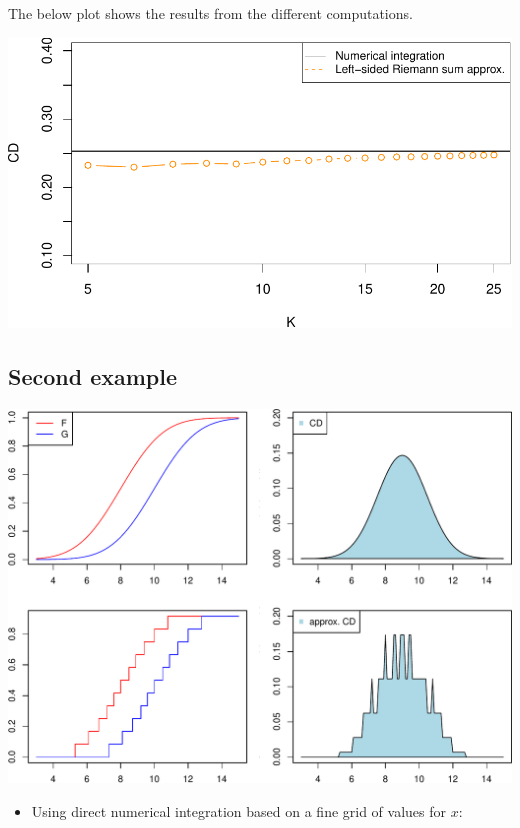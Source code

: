 \documentclass[
]{article}
\providecommand{\tightlist}{%
  \setlength{\itemsep}{0pt}\setlength{\parskip}{0pt}}
\begin{document}
The below plot shows the results from the different computations.

\begin{center}\includegraphics{cd_approx_2_files/figure-latex/unnamed-chunk-7-1} \end{center}

\hypertarget{second-example}{%
\subsection{Second example}\label{second-example}}

\begin{center}\includegraphics{cd_approx_2_files/figure-latex/ex2-1} \end{center}

\begin{itemize}
\tightlist
\item
  Using direct numerical integration based on a fine grid of values for
  \(x\):
\end{itemize}
\end{document}
